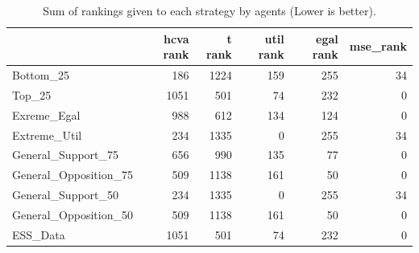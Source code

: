 \begin{table}
\caption{Sum of rankings given to each strategy by agents (Lower is better).}
\begin{tabular}{lrrrrr}
\toprule
 & hcva rank & t rank & util rank & egal rank & mse_rank \\
\midrule
Bottom_25 & 186 & 1224 & 159 & 255 & 34 \\
Top_25 & 1051 & 501 & 74 & 232 & 0 \\
Exreme_Egal & 988 & 612 & 134 & 124 & 0 \\
Extreme_Util & 234 & 1335 & 0 & 255 & 34 \\
General_Support_75 & 656 & 990 & 135 & 77 & 0 \\
General_Opposition_75 & 509 & 1138 & 161 & 50 & 0 \\
General_Support_50 & 234 & 1335 & 0 & 255 & 34 \\
General_Opposition_50 & 509 & 1138 & 161 & 50 & 0 \\
ESS_Data & 1051 & 501 & 74 & 232 & 0 \\
\bottomrule
\end{tabular}
\end{table}
